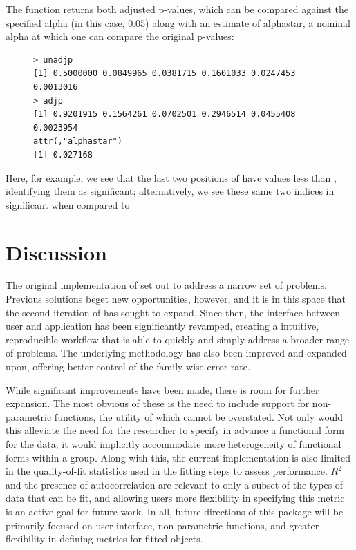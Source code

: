 The  function returns both adjusted p-values, which can be compared against the specified alpha (in this case, $0.05$) along with an estimate of alphastar, a nominal alpha at which one can compare the original p-values:

\begin{singlespace}
\begin{figure}[H]
\centering
\begin{BVerbatim}
> unadjp
[1] 0.5000000 0.0849965 0.0381715 0.1601033 0.0247453 0.0013016
> adjp
[1] 0.9201915 0.1564261 0.0702501 0.2946514 0.0455408 0.0023954
attr(,"alphastar")
[1] 0.027168
\end{BVerbatim}
\end{figure}
\end{singlespace}

Here, for example, we see that the last two positions of  have values less than , identifying them as significant; alternatively, we see these same two indices in  significant when compared to 

\section{Discussion}


The original implementation of  set out to address a narrow set of problems. Previous solutions beget new opportunities, however, and it is in this space that the second iteration of  has sought to expand. Since then, the interface between user and application has been significantly revamped, creating a intuitive, reproducible workflow that is able to quickly and simply address a broader range of problems. The underlying methodology has also been improved and expanded upon, offering better control of the family-wise error rate.

While significant improvements have been made, there is room for further expansion. The most obvious of these is the need to include support for non-parametric functions, the utility of which cannot be overstated. Not only would this alleviate the need for the researcher to specify in advance a functional form for the data, it would implicitly accommodate more heterogeneity of functional forms within a group. Along with this, the current implementation is also limited in the quality-of-fit statistics used in the fitting steps to assess performance. $R^2$ and the presence of autocorrelation are relevant to only a subset of the types of data that can be fit, and allowing users more flexibility in specifying this metric is an active goal for future work. In all, future directions of this package will be primarily focused on user interface, non-parametric functions, and greater flexibility in defining metrics for fitted objects.



